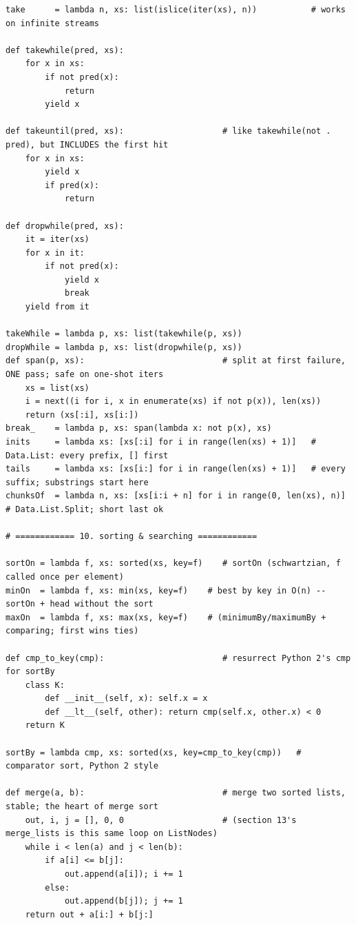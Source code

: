 \documentclass[11pt,letterpaper]{book}
\begin{document}
\begin{lstlisting}[style=file]
take      = lambda n, xs: list(islice(iter(xs), n))           # works on infinite streams

def takewhile(pred, xs):
    for x in xs:
        if not pred(x):
            return
        yield x

def takeuntil(pred, xs):                    # like takewhile(not . pred), but INCLUDES the first hit
    for x in xs:
        yield x
        if pred(x):
            return

def dropwhile(pred, xs):
    it = iter(xs)
    for x in it:
        if not pred(x):
            yield x
            break
    yield from it

takeWhile = lambda p, xs: list(takewhile(p, xs))
dropWhile = lambda p, xs: list(dropwhile(p, xs))
def span(p, xs):                            # split at first failure, ONE pass; safe on one-shot iters
    xs = list(xs)
    i = next((i for i, x in enumerate(xs) if not p(x)), len(xs))
    return (xs[:i], xs[i:])
break_    = lambda p, xs: span(lambda x: not p(x), xs)
inits     = lambda xs: [xs[:i] for i in range(len(xs) + 1)]   # Data.List: every prefix, [] first
tails     = lambda xs: [xs[i:] for i in range(len(xs) + 1)]   # every suffix; substrings start here
chunksOf  = lambda n, xs: [xs[i:i + n] for i in range(0, len(xs), n)]   # Data.List.Split; short last ok

# ============ 10. sorting & searching ============

sortOn = lambda f, xs: sorted(xs, key=f)    # sortOn (schwartzian, f called once per element)
minOn  = lambda f, xs: min(xs, key=f)    # best by key in O(n) -- sortOn + head without the sort
maxOn  = lambda f, xs: max(xs, key=f)    # (minimumBy/maximumBy + comparing; first wins ties)

def cmp_to_key(cmp):                        # resurrect Python 2's cmp for sortBy
    class K:
        def __init__(self, x): self.x = x
        def __lt__(self, other): return cmp(self.x, other.x) < 0
    return K

sortBy = lambda cmp, xs: sorted(xs, key=cmp_to_key(cmp))   # comparator sort, Python 2 style

def merge(a, b):                            # merge two sorted lists, stable; the heart of merge sort
    out, i, j = [], 0, 0                    # (section 13's merge_lists is this same loop on ListNodes)
    while i < len(a) and j < len(b):
        if a[i] <= b[j]:
            out.append(a[i]); i += 1
        else:
            out.append(b[j]); j += 1
    return out + a[i:] + b[j:]


\end{lstlisting}
\end{document}
